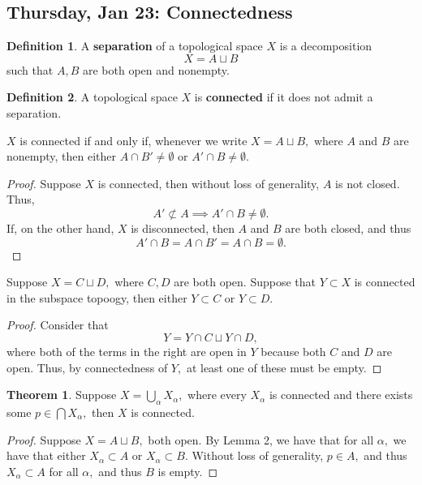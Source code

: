 \documentclass[10pt, oneside]{article}
\theoremstyle{definition}
\newtheorem{thm}{Theorem}
\newtheorem{defn}{Definition}
\begin{document}
\newpage
\subsection{Thursday, Jan 23: Connectedness}
\begin{defn}
    A \textbf{separation} of a topological space $X$ is a decomposition 
    \[X = A \sqcup B\] such that $A,B$ are both open and nonempty.
\end{defn}
\begin{defn}
    A topological space $X$ is \textbf{connected} if it does not admit a separation.
\end{defn}
\begin{lemma}
    $X$ is connected if and only if, whenever we write $X = A \sqcup B,$ where $A$ and $B$ are nonempty, then either $A \cap B' \neq \emptyset$ or $A' \cap B \neq \emptyset.$
\end{lemma}
\begin{proof}
    Suppose $X$ is connected, then without loss of generality, $A$ is not closed. Thus, \[A' \not \subset A \implies A' \cap B \neq \emptyset.\] If, on the other hand, $X$ is disconnected, then $A$ and $B$ are both closed, and thus \[A' \cap B = A \cap B' = A \cap B = \emptyset.\]
\end{proof}
\begin{lemma}
    Suppose $X = C\sqcup D,$ where $C,D$ are both open. Suppose that $Y\subset X$ is connected in the subspace topoogy, then either $Y\subset C$ or $Y\subset D.$
\end{lemma}
\begin{proof}
    Consider that 
    \[Y = Y\cap C \sqcup Y\cap D,\] where both of the terms in the right are open in $Y$ because both $C$ and $D$ are open. Thus, by connectedness of $Y,$ at least one of these must be empty.
\end{proof}
\begin{thm}
    Suppose $X = \bigcup_\alpha X_\alpha,$ where every $X_\alpha$ is connected and there exists some $p \in \bigcap X_\alpha,$ then $X$ is connected.
\end{thm}
\begin{proof}
    Suppose $X = A\sqcup B,$ both open. By Lemma 2, we have that for all $\alpha,$ we have that either $X_\alpha \subset A$ or $X_\alpha \subset B.$ Without loss of generality, $p \in A,$ and thus $X_\alpha \subset A$ for all $\alpha,$ and thus $B$ is empty.
\end{proof}
\end{document}

